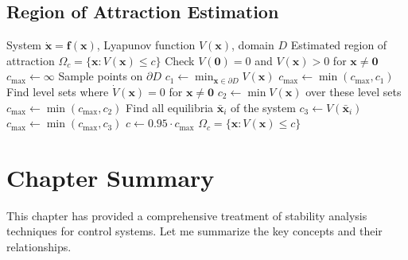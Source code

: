 \subsection{Region of Attraction Estimation}

\begin{algorithm}[H]
\caption{Region of Attraction Estimation via Lyapunov Sublevel Sets}
\label{alg:roa}
\begin{algorithmic}[1]
\REQUIRE System $\dot{\mathbf{x}} = \mathbf{f}(\mathbf{x})$, Lyapunov function $V(\mathbf{x})$, domain $D$
\ENSURE Estimated region of attraction $\Omega_c = \{\mathbf{x} : V(\mathbf{x}) \leq c\}$
\STATE
\STATE {}
\STATE Check $V(\mathbf{0}) = 0$ and $V(\mathbf{x}) > 0$ for $\mathbf{x} \neq \mathbf{0}$
\STATE
\STATE {}
\STATE $c_{\max} \gets \infty$
\STATE
\STATE {}
    \STATE Sample points on $\partial D$
    \STATE $c_1 \gets \min_{\mathbf{x} \in \partial D} V(\mathbf{x})$
    \STATE $c_{\max} \gets \min(c_{\max}, c_1)$
\ENDIF
\STATE
\STATE {}
\STATE Find level sets where $\dot{V}(\mathbf{x}) = 0$ for $\mathbf{x} \neq \mathbf{0}$
\STATE $c_2 \gets \min V(\mathbf{x})$ over these level sets
\STATE $c_{\max} \gets \min(c_{\max}, c_2)$
\STATE
\STATE {}
\STATE Find all equilibria $\bar{\mathbf{x}}_i$ of the system
    \STATE $c_3 \gets V(\bar{\mathbf{x}}_i)$
    \STATE $c_{\max} \gets \min(c_{\max}, c_3)$
\ENDFOR
\STATE
\STATE {}
\STATE $c \gets 0.95 \cdot c_{\max}$ 
\RETURN $\Omega_c = \{\mathbf{x} : V(\mathbf{x}) \leq c\}$
\end{algorithmic}
\end{algorithm}

\section{Chapter Summary}
\label{sec:stability_summary}

This chapter has provided a comprehensive treatment of stability analysis techniques for control systems. Let me summarize the key concepts and their relationships.

